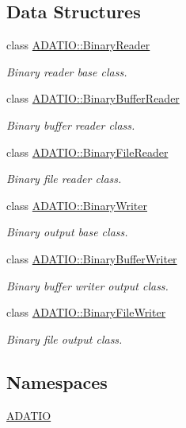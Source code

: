\subsection*{Data Structures}
\begin{DoxyCompactItemize}
\item 
class \mbox{\hyperlink{classADATIO_1_1BinaryReader}{A\+D\+A\+T\+I\+O\+::\+Binary\+Reader}}
\begin{DoxyCompactList}\small\item\em Binary reader base class. \end{DoxyCompactList}\item 
class \mbox{\hyperlink{classADATIO_1_1BinaryBufferReader}{A\+D\+A\+T\+I\+O\+::\+Binary\+Buffer\+Reader}}
\begin{DoxyCompactList}\small\item\em Binary buffer reader class. \end{DoxyCompactList}\item 
class \mbox{\hyperlink{classADATIO_1_1BinaryFileReader}{A\+D\+A\+T\+I\+O\+::\+Binary\+File\+Reader}}
\begin{DoxyCompactList}\small\item\em Binary file reader class. \end{DoxyCompactList}\item 
class \mbox{\hyperlink{classADATIO_1_1BinaryWriter}{A\+D\+A\+T\+I\+O\+::\+Binary\+Writer}}
\begin{DoxyCompactList}\small\item\em Binary output base class. \end{DoxyCompactList}\item 
class \mbox{\hyperlink{classADATIO_1_1BinaryBufferWriter}{A\+D\+A\+T\+I\+O\+::\+Binary\+Buffer\+Writer}}
\begin{DoxyCompactList}\small\item\em Binary buffer writer output class. \end{DoxyCompactList}\item 
class \mbox{\hyperlink{classADATIO_1_1BinaryFileWriter}{A\+D\+A\+T\+I\+O\+::\+Binary\+File\+Writer}}
\begin{DoxyCompactList}\small\item\em Binary file output class. \end{DoxyCompactList}\end{DoxyCompactItemize}
\subsection*{Namespaces}
\begin{DoxyCompactItemize}
\item 
 \mbox{\hyperlink{namespaceADATIO}{A\+D\+A\+T\+IO}}
\end{DoxyCompactItemize}
